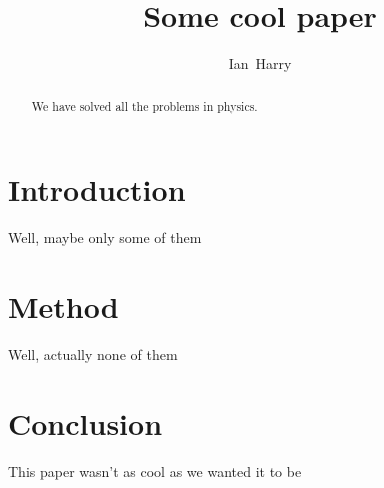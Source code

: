 \documentclass[%
aps,
twocolumn, prd,
showpacs,preprintnumbers,nofootinbib,
amsmath,amssymb,
aps,
10pt,
superscriptaddress]{revtex4}
\begin{document}
\title{Some cool paper}

\author{Ian~Harry} 

\begin{abstract}
We have solved all the problems in physics.
\end{abstract}

\maketitle

\section{Introduction}

Well, maybe only some of them

\section{Method}

Well, actually none of them

\section{Conclusion}

This paper wasn't as cool as we wanted it to be
\end{document}
